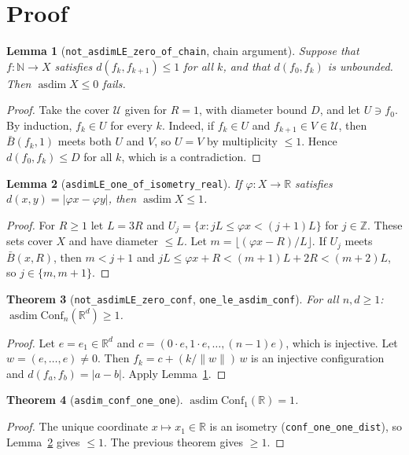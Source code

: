 \documentclass[11pt]{article}
\newtheorem{theorem}{Theorem}
\newtheorem{lemma}[theorem]{Lemma}
\theoremstyle{definition}
\DeclareMathOperator{\asdim}{asdim}
\begin{document}
\section{Proof}
\begin{lemma}[\texttt{not\_asdimLE\_zero\_of\_chain}, chain argument]\label{lem:chain}
Suppose that $f:\mathbb N\to X$ satisfies $d(f_k,f_{k+1})\le1$ for all $k$, and that
$d(f_0,f_k)$ is unbounded. Then $\asdim X\le 0$ fails.
\end{lemma}
\begin{proof}
Take the cover $\mathcal U$ given for $R=1$, with diameter bound $D$, and let $U\ni f_0$. By
induction, $f_k\in U$ for every $k$. Indeed, if $f_k\in U$ and $f_{k+1}\in V\in\mathcal U$, then
$\bar B(f_k,1)$ meets both $U$ and $V$, so $U=V$ by multiplicity $\le1$. Hence
$d(f_0,f_k)\le D$ for all $k$, which is a contradiction.
\end{proof}

\begin{lemma}[\texttt{asdimLE\_one\_of\_isometry\_real}]\label{lem:up}
If $\varphi:X\to\mathbb R$ satisfies $d(x,y)=|\varphi x-\varphi y|$, then $\asdim X\le1$.
\end{lemma}
\begin{proof}
For $R\ge1$ let $L=3R$ and $U_j=\{x: jL\le\varphi x<(j+1)L\}$ for $j\in\mathbb Z$. These sets cover $X$
and have diameter $\le L$. Let $m=\lfloor(\varphi x-R)/L\rfloor$. If $U_j$ meets $\bar B(x,R)$, then
$m<j+1$ and $jL\le\varphi x+R<(m+1)L+2R<(m+2)L$, so $j\in\{m,m+1\}$.
\end{proof}

\begin{theorem}[\texttt{not\_asdimLE\_zero\_conf}, \texttt{one\_le\_asdim\_conf}]
For all $n,d\ge1$: $\asdim\mathrm{Conf}_n(\mathbb R^d)\ge1$.
\end{theorem}
\begin{proof}
Let $e=e_1\in\mathbb R^d$ and $c=(0\cdot e,1\cdot e,\dots,(n-1)e)$, which is injective. Let
$w=(e,\dots,e)\ne0$. Then $f_k=c+(k/\|w\|)\,w$ is an injective configuration and
$d(f_a,f_b)=|a-b|$. Apply Lemma~\ref{lem:chain}.
\end{proof}

\begin{theorem}[\texttt{asdim\_conf\_one\_one}]
$\asdim\mathrm{Conf}_1(\mathbb R)=1$.
\end{theorem}
\begin{proof}
The unique coordinate $x\mapsto x_1\in\mathbb R$ is an isometry (\texttt{conf\_one\_one\_dist}), so
Lemma~\ref{lem:up} gives $\le1$. The previous theorem gives $\ge1$.
\end{proof}
\end{document}
